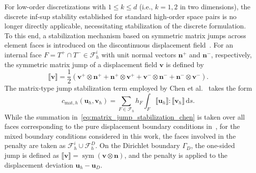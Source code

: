 For low-order discretizations with $1 \le k \le d$ (i.e., $k = 1, 2$ in two dimensions), the discrete inf-sup stability established for standard high-order space pairs is no longer directly applicable, necessitating stabilization of the discrete formulation. To this end, a stabilization mechanism based on symmetric matrix jumps across element faces is introduced on the discontinuous displacement field~\cite{Chen2017}. For an internal face $F = T^+ \cap T^- \in \mathcal{F}_h^i$ with unit normal vectors $\boldsymbol{n}^+$ and $\boldsymbol{n}^-$, respectively, the symmetric matrix jump of a displacement field $\boldsymbol{v}$ is defined by
\begin{equation}
\label{eq:displacement_jump}
\llbracket \boldsymbol{v} \rrbracket = \frac{1}{2}\left( \boldsymbol{v}^+\otimes\boldsymbol{n}^+ + \boldsymbol{n}^+\otimes\boldsymbol{v}^+ + \boldsymbol{v}^-\otimes\boldsymbol{n}^- + \boldsymbol{n}^-\otimes\boldsymbol{v}^- \right).
\end{equation}
The matrix-type jump stabilization term employed by Chen et al.~\cite{Chen2017} takes the form
\begin{equation}
\label{eq:matrix_jump_stabilization_chen}
c_{\mathrm{mat},h}(\boldsymbol{u}_h,\boldsymbol{v}_h)
=\sum_{F\in\mathcal{F}_h}h_F\int_F \llbracket \boldsymbol{u}_h \rrbracket : \llbracket \boldsymbol{v}_h \rrbracket \,\mathrm{d}s.
\end{equation}
While the summation in~\eqref{eq:matrix_jump_stabilization_chen} is taken over all faces corresponding to the pure displacement boundary conditions in~\cite{Chen2017}, for the mixed boundary conditions considered in this work, the faces involved in the penalty are taken as $\mathcal{F}_h^i \cup \mathcal{F}_h^D$. On the Dirichlet boundary $\Gamma_D$, the one-sided jump is defined as $\llbracket \boldsymbol{v} \rrbracket = \operatorname{sym}(\boldsymbol{v} \otimes \boldsymbol{n})$, and the penalty is applied to the displacement deviation $\boldsymbol{u}_h - \boldsymbol{u}_D$.

